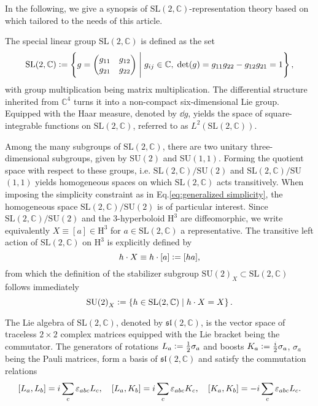 \documentclass[11pt,a4paper]{article}
\newcommand{\C}{\mathbb C}
\newcommand{\SU}{\text{SU$(2)$}}
\newcommand{\SL}{\text{SL$(2,\C)$}}
\newcommand{\spl}{\mathfrak{sl}\left(2,\C\right)}
\newcommand{\HH}{\text{H}^3}
\newcommand{\defeq}{\vcentcolon=}
\begin{document}
In the following, we give a synopsis of $\SL$-representation theory based on~\cite{Duc1967,Martin-Dussaud:2019ypf,Ruehl1970} which tailored to the needs of this article.

The special linear group $\SL$ is defined as the set
%
\begin{equation}
\SL\defeq\left\{g = \mqty(g_{11} & g_{12}\\ g_{21} & g_{22})\; \Bigg{\vert} \; g_{ij}\in\C,\; \det(g) = g_{11}g_{22}-g_{12}g_{21} = 1\right\},
\end{equation} 
with group multiplication being matrix multiplication. The differential structure inherited from $\C^4$ turns it into a non-compact six-dimensional Lie group. Equipped with the Haar measure, denoted by $\dd{g}$, yields the space of square-integrable functions on $\SL$, referred to as $L^2(\SL)$. 

Among the many subgroups of $\SL$, there are two unitary three-dimensional subgroups, given by $\SU$ and SU$(1,1)$. Forming the quotient space with respect to these groups, i.e. $\SL/\SU$ and $\SL/$SU$(1,1)$ yields homogeneous spaces on which $\SL$ acts transitively. When imposing the simplicity constraint as in Eq.\eqref{eq:generalized simplicity}, the homogeneous space $\SL/\SU$ is of particular interest. Since $\SL/\SU$ and the 3-hyperboloid $\HH$ are diffeomorphic, we write equivalently $X\equiv [a]\in\HH$ for $a\in\SL$ a representative. The transitive left action of $\SL$ on $\HH$ is explicitly defined by
%
\begin{equation}
h\cdot X \equiv h\cdot[a] \defeq [ha],
\end{equation}
%
from which the definition of the stabilizer subgroup $\SU_X\subset\SL$ follows immediately
%
\begin{equation}\label{eq:invariance under seperate SU2}
\SU_X
\defeq
\left\{ h\in\SL \; \vert \; h\cdot X = X\right\}.
\end{equation}
% 

The Lie algebra of $\SL$, denoted by $\spl$, is the vector space of traceless $2\times 2$ complex matrices equipped with the Lie bracket being the commutator. The generators of rotations $L_a \defeq \frac{1}{2}\sigma_a$ and boosts $K_a \defeq \frac{i}{2}\sigma_a$, $\sigma_a$ being the Pauli matrices, form a basis of $\spl$ and satisfy the commutation relations
%
\begin{equation}\label{eq:commutation relations of SL-generators}
\comm{L_a}{L_b} = i\sum_c \varepsilon_{abc}L_c,\quad \comm{L_a}{K_b} = i\sum_c\varepsilon_{abc}K_c,\quad \comm{K_a}{K_b} = -i\sum_c\varepsilon_{abc}L_c.
\end{equation}
%
\end{document}
